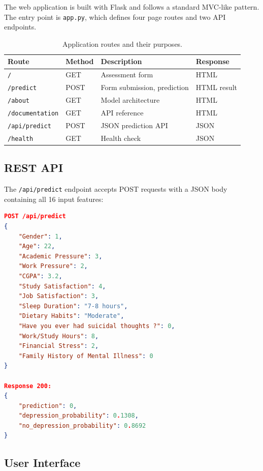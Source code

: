 \documentclass[11pt,a4paper]{article}
\begin{document}
The web application is built with Flask and follows a standard MVC-like pattern. The entry point is \texttt{app.py}, which defines four page routes and two API endpoints.

\begin{table}[htbp]
\centering
\begin{tabular}{llll}
\toprule
\textbf{Route} & \textbf{Method} & \textbf{Description} & \textbf{Response} \\
\midrule
\texttt{/} & GET & Assessment form & HTML \\
\texttt{/predict} & POST & Form submission, prediction & HTML result \\
\texttt{/about} & GET & Model architecture & HTML \\
\texttt{/documentation} & GET & API reference & HTML \\
\texttt{/api/predict} & POST & JSON prediction API & JSON \\
\texttt{/health} & GET & Health check & JSON \\
\bottomrule
\end{tabular}
\caption{Application routes and their purposes.}
\end{table}

\nopagebreak
\subsection{REST API}

The \texttt{/api/predict} endpoint accepts POST requests with a JSON body containing all 16 input features:

\nopagebreak
\begin{lstlisting}[caption={Example API request and response},language=JSON,numbers=none]
POST /api/predict
{
    "Gender": 1,
    "Age": 22,
    "Academic Pressure": 3,
    "Work Pressure": 2,
    "CGPA": 3.2,
    "Study Satisfaction": 4,
    "Job Satisfaction": 3,
    "Sleep Duration": "7-8 hours",
    "Dietary Habits": "Moderate",
    "Have you ever had suicidal thoughts ?": 0,
    "Work/Study Hours": 8,
    "Financial Stress": 2,
    "Family History of Mental Illness": 0
}

Response 200:
{
    "prediction": 0,
    "depression_probability": 0.1308,
    "no_depression_probability": 0.8692
}
\end{lstlisting}

\subsection{User Interface}
\end{document}
